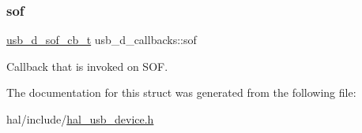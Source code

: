 \subsubsection{\texorpdfstring{sof}{sof}}
{\footnotesize\ttfamily \hyperlink{group__doc__driver__hal__usb__device_gaad808712d16d588e66167b3719c521ec}{usb\+\_\+d\+\_\+sof\+\_\+cb\+\_\+t} usb\+\_\+d\+\_\+callbacks\+::sof}

Callback that is invoked on S\+OF. 

The documentation for this struct was generated from the following file\+:\begin{DoxyCompactItemize}
\item 
hal/include/\hyperlink{hal__usb__device_8h}{hal\+\_\+usb\+\_\+device.\+h}\end{DoxyCompactItemize}
